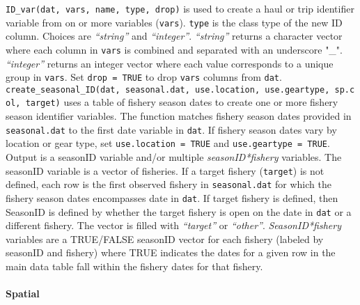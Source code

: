 \documentclass[
]{article}
\begin{document}
\texttt{ID\_var(dat,\ vars,\ name,\ type,\ drop)} is used to create a haul or trip identifier variable from on or more variables (\texttt{vars}). \texttt{type} is the class type of the new ID column. Choices are \emph{``string''} and \emph{``integer''}. \emph{``string''} returns a character vector where each column in \texttt{vars} is combined and separated with an underscore "\_". \emph{``integer''} returns an integer vector where each value corresponds to a unique group in \texttt{vars}. Set \texttt{drop\ =\ TRUE} to drop \texttt{vars} columns from \texttt{dat}.\\
\texttt{create\_seasonal\_ID(dat,\ seasonal.dat,\ use.location,\ use.geartype,\ sp.col,\ target)} uses a table of fishery season dates to create one or more fishery season identifier variables. The function matches fishery season dates provided in \texttt{seasonal.dat} to the first date variable in \texttt{dat}. If fishery season dates vary by location or gear type, set \texttt{use.location\ =\ TRUE} and \texttt{use.geartype\ =\ TRUE}. Output is a seasonID variable and/or multiple \emph{seasonID*fishery} variables. The seasonID variable is a vector of fisheries. If a target fishery (\texttt{target}) is not defined, each row is the first observed fishery in \texttt{seasonal.dat} for which the fishery season dates encompasses date in \texttt{dat}. If target fishery is defined, then SeasonID is defined by whether the target fishery is open on the date in \texttt{dat} or a different fishery. The vector is filled with \emph{``target''} or \emph{``other''}. \emph{SeasonID*fishery} variables are a TRUE/FALSE seasonID vector for each fishery (labeled by seasonID and fishery) where TRUE indicates the dates for a given row in the main data table fall within the fishery dates for that fishery.

\hypertarget{spatial}{%
\paragraph{Spatial}\label{spatial}}
\end{document}
